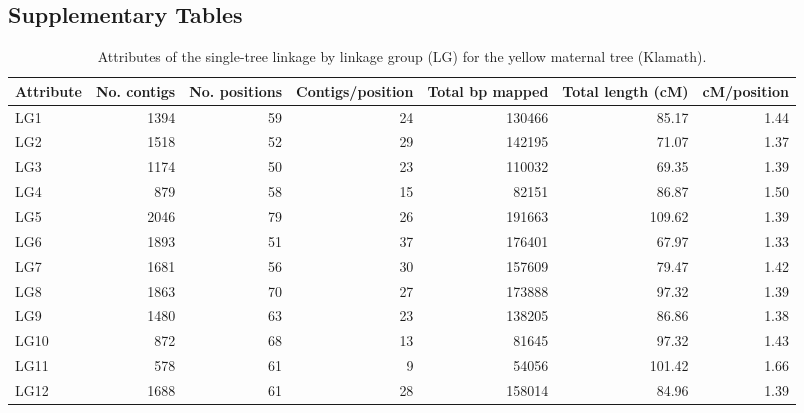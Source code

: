 \documentclass[smallextended]{svjour3}
\begin{document}
\begin{landscape}

\subsection*{Supplementary Tables}\label{ss:supp}

  
\begin{table}[ht]
  \caption{Attributes of the single-tree linkage by linkage group (LG) for the yellow maternal tree (Klamath).}
\begin{tabular}{lrrrrrr}
\toprule
Attribute & No. contigs & No. positions & Contigs/position & Total bp mapped & Total length (cM) & cM/position \\
\midrule
LG1 & 1394 & 59 & 24 & \num{130466} & 85.17 & 1.44 \\
LG2 & 1518 & 52 & 29 & \num{142195} & 71.07 & 1.37 \\
LG3 & 1174 & 50 & 23 & \num{110032} & 69.35 & 1.39 \\
LG4 & 879 & 58 & 15 & \num{82151} & 86.87 & 1.50 \\
LG5 & 2046 & 79 & 26 & \num{191663} & 109.62 & 1.39 \\
LG6 & 1893 & 51 & 37 & \num{176401} & 67.97 & 1.33 \\
LG7 & 1681 & 56 & 30 & \num{157609} & 79.47 & 1.42 \\
LG8 & 1863 & 70 & 27 & \num{173888} & 97.32 & 1.39 \\
LG9 & 1480 & 63 & 23 & \num{138205} & 86.86 & 1.38 \\
LG10 & 872 & 68 & 13 & \num{81645} & 97.32 & 1.43 \\
LG11 & 578 & 61 & 9 & \num{54056} & 101.42 & 1.66 \\
LG12 & 1688 & 61 & 28 & \num{158014} & 84.96 & 1.39 \\
\bottomrule
\end{tabular} 
\label{t:label}
\end{table}
\end{landscape}
\end{document}
